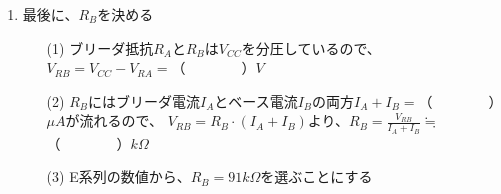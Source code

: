 \documentclass[uplatex,a4paper,11pt,oneside,openany]{jsbook}
\begin{document}
\begin{enumerate}
\begin{itembox}[l]{設計条件}
  (6) このトランジスタのベース−エミッタ間の電圧は$V_{BE}\fallingdotseq 0.6V$である。\\
  (7) $R_A$にはベース電流$I_B$の20倍の電流（ブリーダ電流$I_A$）を流すことにする。
  \end{itembox}
  \begin{enumerate}
  \item[(1)] コレクタ電流$I_C$に$1mA$を流す時のベース電流$I_B$は、
  $I_B=\displaystyle\frac{I_C}{h_{FE}}=$（　　　　）$\mu A$
  \item[(2)] 設計条件（7）よりブリーダ電流は、$I_A=20\times I_B=$（　　　　）$\mu A$
  \item[(3)] ベース電位は$V_B=V_{BE}+V_{RE}$であるから、$V_B=（　　　）＋（　　　）$=（　　　）$V$
  \item[(4)] この値$V_B$は、$R_A$にブリーダ電流$I_A$が流れることによる電圧降下$V_{RA}$に等しいから、\\
  $R_A=\displaystyle\frac{V_{RA}}{I_A}=\frac{V_B}{I_A}=$（　　　）$k\Omega$
  \end{enumerate}
  \vfill
  \item 最後に、$R_B$を決める
  \begin{enumerate}
  \item[(1)] ブリーダ抵抗$R_A$と$R_B$は$V_{CC}$を分圧しているので、
  $V_{RB}=V_{CC}-V_{RA}=$（　　　　）$V$
  \item[(2)] $R_B$にはブリーダ電流$I_A$とベース電流$I_B$の両方$I_A+I_B=$（　　　　）$\mu A$が流れるので、
  $V_{RB}=R_B\cdot(I_A+I_B)$より、$R_B=\displaystyle\frac{V_{RB}}{I_A+I_B}\fallingdotseq$（　　　　）$k\Omega$
  \item[(3)] E系列の数値から、$R_B=91k\Omega$を選ぶことにする
  \end{enumerate}
\end{enumerate}

\end{document}

